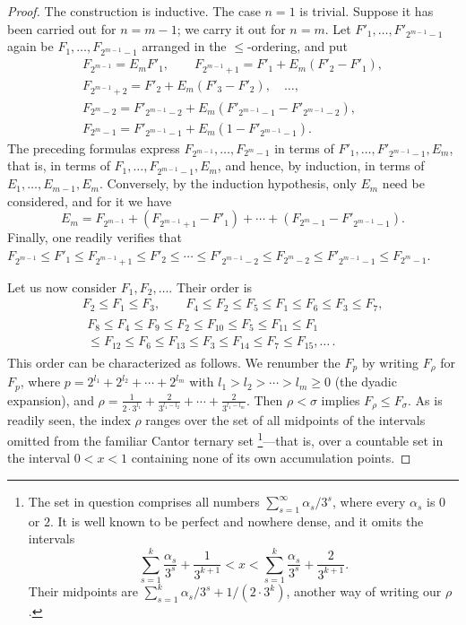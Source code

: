 \documentclass[
  paper=b5,
  twoside=true,
  fontsize=13pt,
  headings=normal,
  bookmarkpackage=false
]{scrartcl}
\theoremstyle{definition}
\begin{document}
\begin{proof}
The construction is inductive. The case \(n=1\) is trivial. Suppose
it has been carried out for \(n=m-1\); we carry it out for \(n=m\).
Let \(F'_1,\ldots,F'_{2^{m-1}-1}\) again be
\(F_1,\ldots,F_{2^{m-1}-1}\) arranged in the \(\leq\)-ordering, and put
\begin{gather*}
  F_{2^{m-1}}=E_mF'_1,\qquad
  F_{2^{m-1}+1}=F'_1+E_m(F'_2-F'_1),\\
  F_{2^{m-1}+2}=F'_2+E_m(F'_3-F'_2),\quad\ldots,\\
  F_{2^m-2}=F'_{2^{m-1}-2}
    +E_m(F'_{2^{m-1}-1}-F'_{2^{m-1}-2}),\\
  F_{2^m-1}=F'_{2^{m-1}-1}
    +E_m(1-F'_{2^{m-1}-1}).
\end{gather*}
The preceding formulas express \(F_{2^{m-1}},\ldots,F_{2^m-1}\) in terms
of \(F'_1,\ldots,F'_{2^{m-1}-1},E_m\), that is, in terms of
\(F_1,\ldots,F_{2^{m-1}-1},E_m\), and hence, by induction, in terms of
\(E_1,\ldots,E_{m-1},E_m\). Conversely, by the induction hypothesis,
only \(E_m\) need be considered, and for it we have
\[
  E_m=F_{2^{m-1}}+(F_{2^{m-1}+1}-F'_1)+\cdots+
  (F_{2^m-1}-F'_{2^{m-1}-1}).
\]
Finally, one readily verifies that
\(F_{2^{m-1}}\leq F'_1\leq F_{2^{m-1}+1}\leq F'_2\leq\cdots
\leq F'_{2^{m-1}-2}\leq F_{2^m-2}
\leq F'_{2^{m-1}-1}\leq F_{2^m-1}\).

Let us now consider \(F_1,F_2,\ldots\). Their order is
\begin{gather*}
  F_2\leq F_1\leq F_3,\qquad
  F_4\leq F_2\leq F_5\leq F_1\leq F_6\leq F_3\leq F_7,\\
  \begin{multlined}
  F_8\leq F_4\leq F_9\leq F_2\leq F_{10}\leq F_5\leq F_{11}\leq F_1\\
  {}\leq F_{12}\leq F_6\leq F_{13}\leq F_3
  \leq F_{14}\leq F_7\leq F_{15},\ldots\,.
  \end{multlined}
\end{gather*}
This order can be characterized as follows. We renumber the \(F_p\) by
writing \(F_\rho\) for \(F_p\), where
\(p=2^{l_1}+2^{l_2}+\cdots+2^{l_m}\) with \(l_1>l_2>\cdots>l_m\geq0\)
(the dyadic expansion), and
\(\rho=\frac{1}{2\cdot3^{l_1}}+\frac{2}{3^{l_1-l_2}}+\cdots+
\frac{2}{3^{l_1-l_m}}\). Then \(\rho<\sigma\) implies \(F_\rho\leq
F_\sigma\). As is readily seen, the index \(\rho\) ranges over the set
of all midpoints of the intervals omitted from the familiar Cantor
ternary set%
\footnote{\label{fn:57}The set in question comprises all numbers
\(\sum_{s=1}^{\infty}\alpha_s/3^s\), where every
\(\alpha_s\) is \(0\) or \(2\). It is well known to be perfect and
nowhere dense, and it omits the intervals
\[
  \sum_{s=1}^{k}\frac{\alpha_s}{3^s}+\frac{1}{3^{k+1}}
  <x<
  \sum_{s=1}^{k}\frac{\alpha_s}{3^s}+\frac{2}{3^{k+1}}.
\]
Their midpoints are
\(\sum_{s=1}^{k}\alpha_s/3^s+1/(2\cdot3^k)\), another way of writing
our \(\rho\).}---that is, over a countable set in the interval
\(0<x<1\) containing none of its own accumulation points.


\end{proof}
\end{document}
